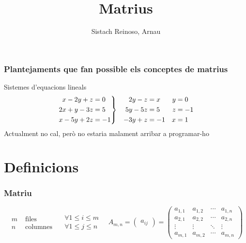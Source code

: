 \documentclass[a4paper,10pt]{article}
\author{Sistach Reinoso, Arnau}
\title{Matrius}
\newcommand{\green}[1]{{\color{green}#1}}
\newenvironment{rcases}
	{\left.\begin{aligned}}
	{\end{aligned}\right\rbrace}
\begin{document}
\maketitle
\tableofcontents
\newpage

\section{Plantejaments que fan possible els conceptes de matrius}
Sistemes d'equacions lineals
\begin{equation*}
\begin{rcases}
x - 2y + z	&= 0	\\
2x + y - 3z	&= 5	\\
x - 5y + 2z	&= -1
\end{rcases}\quad
\begin{aligned}
2y - z	&= x	\\
5y - 5z	&= 5	\\
-3y + z	&= -1
\end{aligned}\quad
\begin{aligned}
y &= 0\\z &= -1\\x &= 1
\end{aligned}
\end{equation*}
Actualment no cal, però no estaria malament arribar a programar-ho

\part{\green{Definicions}}
\section{Matriu}
\begin{equation*}
\begin{aligned}
m &\text{ files}\\
n &\text{ columnes}
\end{aligned}\quad
\begin{aligned}
\forall 1 \le i \le m\\
\forall 1 \le j \le n
\end{aligned}\quad
A_{m, n} = \begin{pmatrix} a_{ij} \end{pmatrix} =
\begin{pmatrix}
	a_{1,1} & a_{1,2} & \cdots & a_{1,n} \\
	a_{2,1} & a_{2,2} & \cdots & a_{2,n} \\
	\vdots  & \vdots  & \ddots & \vdots  \\
	a_{m,1} & a_{m,2} & \cdots & a_{m,n}
\end{pmatrix}
\end{equation*}
\end{document}

